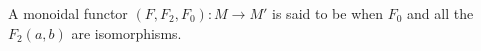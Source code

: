 A monoidal functor $(F, F_2, F_0) : M \rightarrow M'$ is said to be  when $F_0$ and all the $F_2(a, b)$ are isomorphisms.
